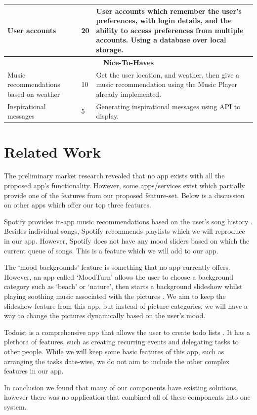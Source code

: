 \documentclass[conference]{IEEEtran}
\begin{document}
\begin{table}[htbp]
{\begin{tabular}{|p{18mm}|p{13mm}|p{45mm}|}
\hline
User accounts & 20 & User accounts which remember the user’s preferences, with login details, and the ability to access preferences from multiple accounts.
Using a database over local storage. \\
\hline
\multicolumn{3}{|c|}{\textbf{Nice-To-Haves}} \\
\hline 
Music recommendations based on weather & 10 & Get the user location, and weather, then give a music recommendation using the Music Player already implemented. \\
\hline
Inspirational messages & 5 & Generating inspirational messages using API to display. \\
\hline
\end{tabular}}
\end{table}


\section{Related Work}
The preliminary market research revealed that no app exists with all the proposed app’s functionality. However, some apps/services exist which partially provide one of the features from our proposed feature-set. Below is a discussion on other apps which offer our top three features.

Spotify provides in-app music recommendations based on the user’s song history \cite{b4}. Besides individual songs, Spotify recommends playlists which we will reproduce in our app. However, Spotify does not have any mood sliders based on which the current queue of songs. This is a feature which we will add to our app. 

The ‘mood backgrounds’ feature is something that no app currently offers. However, an app called ‘MoodTurn’ allows the user to choose a background category such as ‘beach’ or ‘nature’, then starts a background slideshow whilst playing soothing music associated with the pictures \cite{b3}. We aim to keep the slideshow feature from this app, but instead of picture categories, we will have a way to change the pictures dynamically based on the user’s mood. 

Todoist is a comprehensive app that allows the user to create todo lists \cite{b5}. It has a plethora of features, such as creating recurring events and delegating tasks to other people. While we will keep some basic features of this app, such as arranging the tasks date-wise, we do not aim to include the other complex features in our app.

In conclusion we found that many of our components have existing solutions, however there was no application that combined all of these components into one system.
\end{document}
